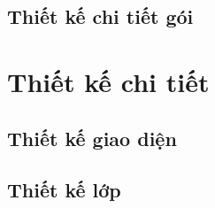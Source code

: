 \subsection*{Thiết kế chi tiết gói}
\label{subsec:tk-chitietgoi}

\section{Thiết kế chi tiết}
\label{sec:tk-chitiet}

\subsection*{Thiết kế giao diện}
\label{subsec:tk-giaodien}

\subsection*{Thiết kế lớp}
\label{subsec:tk-lop}
\label{sec:tk-hopdong}
\label{sec:tk-tuantu}
%
%
%
%

